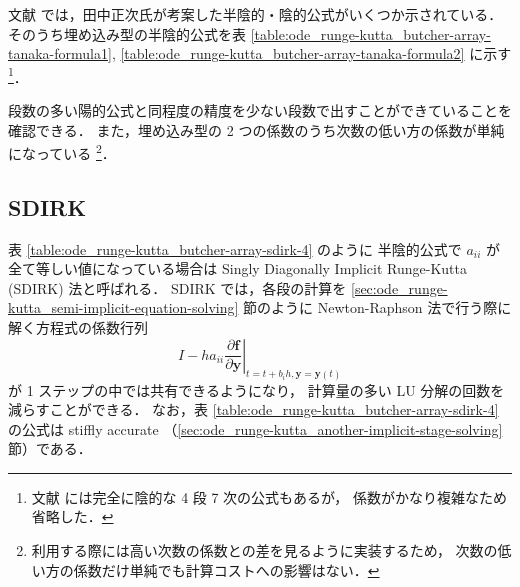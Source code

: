 文献 \cite{Togawa2007} では，田中正次氏が考案した半陰的・陰的公式がいくつか示されている．
そのうち埋め込み型の半陰的公式を表
\ref{table:ode_runge-kutta_butcher-array-tanaka-formula1},
\ref{table:ode_runge-kutta_butcher-array-tanaka-formula2}
に示す
\footnote{文献 \cite{Togawa2007} には完全に陰的な 4 段 7 次の公式もあるが，%
    係数がかなり複雑なため省略した．}．

段数の多い陽的公式と同程度の精度を少ない段数で出すことができていることを確認できる．
また，埋め込み型の 2 つの係数のうち次数の低い方の係数が単純になっている
\footnote{利用する際には高い次数の係数との差を見るように実装するため，%
    次数の低い方の係数だけ単純でも計算コストへの影響はない．}．

\subsection{SDIRK}

表 \ref{table:ode_runge-kutta_butcher-array-sdirk-4} のように
半陰的公式で $a_{ii}$ が全て等しい値になっている場合は
Singly Diagonally Implicit Runge-Kutta (SDIRK) 法と呼ばれる．
SDIRK では，各段の計算を
\ref{sec:ode_runge-kutta_semi-implicit-equation-solving}
節のように Newton-Raphson 法で行う際に解く方程式の係数行列
\begin{equation}
    I - h a_{ii}
    \left. \frac{\partial \bm{f}}{\partial \bm{y}}
    \right|_{t = t + b_i h, \bm{y} = \bm{y}(t)}
\end{equation}
が 1 ステップの中では共有できるようになり，
計算量の多い LU 分解の回数を減らすことができる．
なお，表 \ref{table:ode_runge-kutta_butcher-array-sdirk-4} の公式は
stiffly accurate （\ref{sec:ode_runge-kutta_another-implicit-stage-solving} 節）である．

